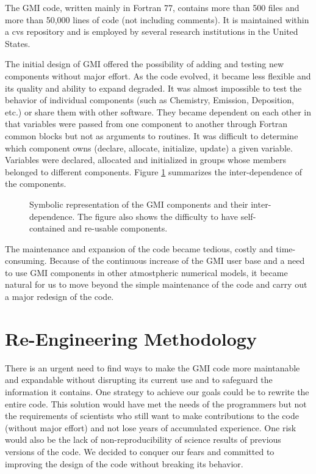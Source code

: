 \documentclass[11pt]{article}
\begin{document}
The GMI code, written mainly in Fortran 77, contains more than 500 files 
and more than 50,000 lines of code (not including comments).
It is maintained within a cvs repository and is employed by several research 
institutions in the United States.

The initial design of GMI offered the possibility of adding and testing
new components without major effort.
As the code evolved, it became less flexible and its quality and ability to
expand degraded.
It was almost impossible to test the behavior of individual components
(such as Chemistry, Emission, Deposition, etc.) or share them with other software.
They became dependent on each other in that
variables were passed from one component to another through Fortran
common blocks but not as arguments to routines.
It was difficult to determine which component owns 
(declare, allocate, initialize, update) a given variable.
Variables were declared, allocated and initialized in groups whose
members belonged to different components.
Figure \ref{fig:oldComp} summarizes the inter-dependence of the components.

\begin{figure}
\centerline{}
\caption{Symbolic representation of the GMI components and their 
inter-dependence. The figure also shows the difficulty to have self-contained
and re-usable components.}
\label{fig:oldComp}
\end{figure}

The maintenance and expansion of the code became tedious, costly and 
time-consuming.
Because of the continuous increase of the GMI user base and a need
to use GMI components in other atmostpheric numerical models,
it became natural for us to move beyond the simple
maintenance of the code and carry out a major redesign of the code.

\section{Re-Engineering Methodology} \label{sec:meth}
%
There is an urgent need to find ways to make the GMI code more maintanable
and expandable without disrupting its current use and to safeguard the 
information it contains.
One strategy to achieve our goals could be to rewrite the entire code.
This solution would have met the needs of the programmers but not the 
requirements of scientists who still want to make contributions to the code
(without major effort) and not lose years of accumulated experience. 
One risk would also be the lack of non-reproducibility of science results 
of previous versions of the code.
We decided to conquer our fears \cite{Feathers04} and committed to improving
the design of the code without breaking its behavior.
\end{document}
